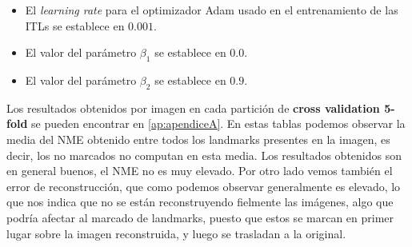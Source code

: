             \begin{itemize}
                \item El \textit{learning rate} para el optimizador Adam usado en el entrenamiento de las ITLs se establece en $0.001$. 
                \item El valor del parámetro $\beta_1$ se establece en $0.0$.
                \item El valor del parámetro $\beta_2$ se establece en $0.9$.
            \end{itemize}

            \noindent Los resultados obtenidos por imagen en cada partición de \textbf{cross validation 5-fold } se pueden encontrar en \autoref{ap:apendiceA}. En estas tablas podemos observar la media del NME obtenido entre todos los landmarks presentes en la imagen, es decir, los no marcados no computan en esta media. Los resultados obtenidos son en general buenos, el NME no es muy elevado. Por otro lado vemos también el error de reconstrucción, que como podemos observar generalmente es elevado, lo que nos indica que no se están reconstruyendo fielmente las imágenes, algo que podría afectar al marcado de landmarks, puesto que estos se marcan en primer lugar sobre la imagen reconstruida, y luego se trasladan a la original.


